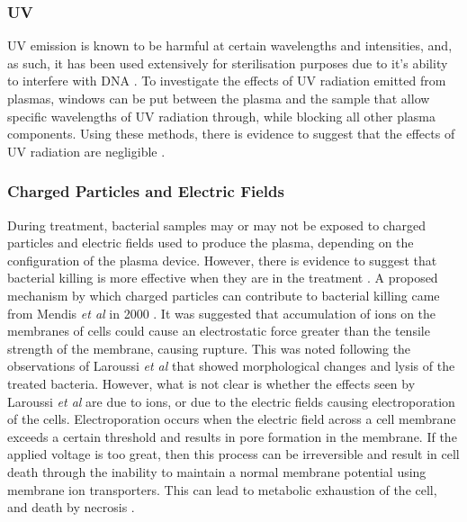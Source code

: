 \documentclass[11pt, oneside]{article}   	%
\begin{document}
\subsubsection{UV}
UV emission is known to be harmful at certain wavelengths and intensities, and, as such, it has been used extensively for sterilisation purposes due to it's ability to interfere with DNA \cite{Laroussi2004evaluation}.
To investigate the effects of UV radiation emitted from plasmas, windows can be put between the plasma and the sample that allow specific wavelengths of UV radiation through, while blocking all other plasma components. 
Using these methods, there is evidence to suggest that the effects of UV radiation are negligible \cite{Laroussi2004evaluation, Dobrynin2009physical}.

\subsubsection{Charged Particles and Electric Fields}
During treatment, bacterial samples may or may not be exposed to charged particles and electric fields used to produce the plasma, depending on the configuration of the plasma device.
However, there is evidence to suggest that bacterial killing is more effective when they are in the treatment \cite{Fridman2007comparison}.
A proposed mechanism by which charged particles can contribute to bacterial killing came from Mendis \textit{et al} in 2000 \cite{Mendis2000a}.
It was suggested that accumulation of ions on the membranes of cells could cause an electrostatic force greater than the tensile strength of the membrane, causing rupture.
This was noted following the observations of Laroussi \textit{et al} \cite{Laroussi1999images} that showed morphological changes and lysis of the treated bacteria.
However, what is not clear is whether the effects seen by Laroussi \textit{et al} are due to ions, or due to the electric fields causing electroporation of the cells.
Electroporation occurs when the electric field across a cell membrane exceeds a certain threshold and results in pore formation in the membrane. If the applied voltage is too great, then this process can be irreversible and result in cell death through the inability to maintain a normal membrane potential using membrane ion transporters. 
This can lead to metabolic exhaustion of the cell, and death by necrosis \cite{Lee2006cell}.
\end{document}
